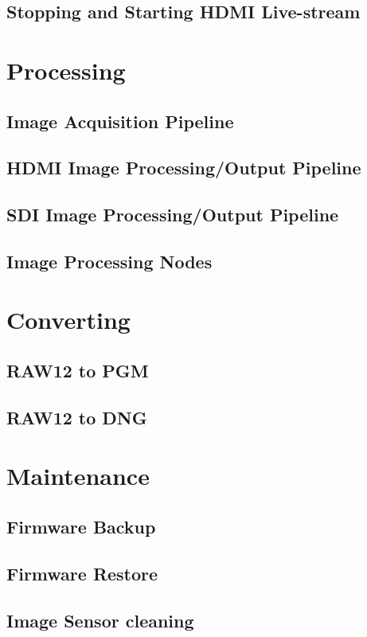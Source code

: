 \documentclass{article}
\begin{document}
\subsection{Stopping and Starting HDMI Live-stream}

\section{Processing}
\subsection{Image Acquisition Pipeline}
\subsection{HDMI Image Processing/Output Pipeline}
\subsection{SDI Image Processing/Output Pipeline}
\subsection{Image Processing Nodes}

\section{Converting}
\subsection{RAW12 to PGM}
\subsection{RAW12 to DNG}

\section{Maintenance}
\subsection{Firmware Backup}
\subsection{Firmware Restore}
\subsection{Image Sensor cleaning}
\end{document}
